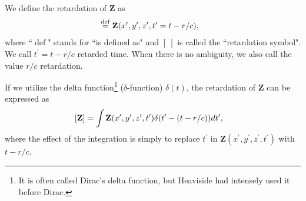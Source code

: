 \documentclass[11pt]{article}              %
\begin{document}
We define the retardation of ${\mathbf Z}$ as
\begin{align}
[\mathbf Z]&\stackrel{\operatorname{def}}{=}{\mathbf Z}(x^\prime,y^\prime,z^\prime,t^\prime=t-r/c),\notag
\end{align}
where ``$\operatorname{def}$" stands for ``is defined as"
and $[\ ]$ is called the ``retardation symbol". We call $t^\prime=t-r/c$ retarded time. When there is no ambiguity, we also call the value $r/c$ retardation.





If we utilize the delta function\footnote{It is often called Dirac's delta function, but Heaviside had intensely used it before Dirac.} ($\delta$-function) 
 $\delta(t)$, the retardation of ${\mathbf Z}$ can be expressed as
\begin{align}
 [{\mathbf Z}]&=\int {\mathbf Z}(x^\prime,y^\prime,z^\prime,t^\prime) \delta(t^\prime-(t-r/c)) dt^\prime,\notag
\end{align}
where the effect of the integration is simply to replace $t^\prime$ in ${\mathbf Z}(x^\prime,y^\prime,z^\prime,t^\prime)$ with $t-r/c$.
\end{document}
